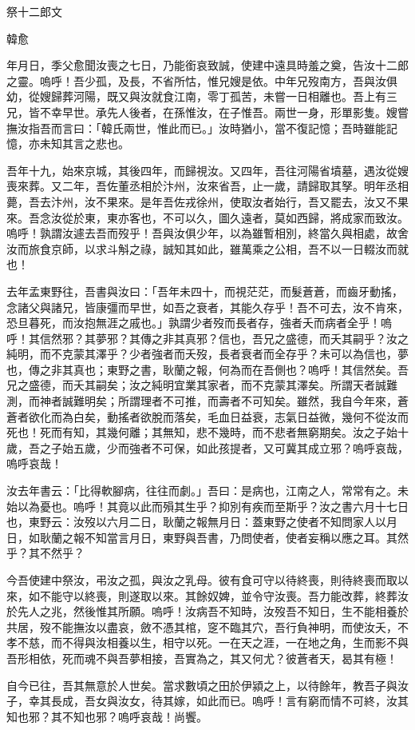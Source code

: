 祭十二郎文

韓愈

年月日，季父愈聞汝喪之七日，乃能銜哀致誠，使建中遠具時羞之奠，告汝十二郎之靈。嗚呼！吾少孤，及長，不省所怙，惟兄嫂是依。中年兄歿南方，吾與汝俱幼，從嫂歸葬河陽，既又與汝就食江南，零丁孤苦，未嘗一日相離也。吾上有三兄，皆不幸早世。承先人後者，在孫惟汝，在子惟吾。兩世一身，形單影隻。嫂嘗撫汝指吾而言曰：「韓氏兩世，惟此而已。」汝時猶小，當不復記憶；吾時雖能記憶，亦未知其言之悲也。

吾年十九，始來京城，其後四年，而歸視汝。又四年，吾往河陽省墳墓，遇汝從嫂喪來葬。又二年，吾佐董丞相於汴州，汝來省吾，止一歲，請歸取其孥。明年丞相薨，吾去汴州，汝不果來。是年吾佐戎徐州，使取汝者始行，吾又罷去，汝又不果來。吾念汝從於東，東亦客也，不可以久，圖久遠者，莫如西歸，將成家而致汝。嗚呼！孰謂汝遽去吾而歿乎！吾與汝俱少年，以為雖暫相別，終當久與相處，故舍汝而旅食京師，以求斗斛之祿，誠知其如此，雖萬乘之公相，吾不以一日輟汝而就也！

去年孟東野往，吾書與汝曰：「吾年未四十，而視茫茫，而髮蒼蒼，而齒牙動搖，念諸父與諸兄，皆康彊而早世，如吾之衰者，其能久存乎！吾不可去，汝不肯來，恐旦暮死，而汝抱無涯之戚也。」孰謂少者歿而長者存，強者夭而病者全乎！嗚呼！其信然邪？其夢邪？其傳之非其真邪？信也，吾兄之盛德，而夭其嗣乎？汝之純明，而不克蒙其澤乎？少者強者而夭歿，長者衰者而全存乎？未可以為信也，夢也，傳之非其真也；東野之書，耿蘭之報，何為而在吾側也？嗚呼！其信然矣。吾兄之盛德，而夭其嗣矣；汝之純明宜業其家者，而不克蒙其澤矣。所謂天者誠難測，而神者誠難明矣；所謂理者不可推，而壽者不可知矣。雖然，我自今年來，蒼蒼者欲化而為白矣，動搖者欲脫而落矣，毛血日益衰，志氣日益微，幾何不從汝而死也！死而有知，其幾何離；其無知，悲不幾時，而不悲者無窮期矣。汝之子始十歲，吾之子始五歲，少而強者不可保，如此孩提者，又可冀其成立邪？嗚呼哀哉，嗚呼哀哉！

汝去年書云：「比得軟腳病，往往而劇。」吾曰：是病也，江南之人，常常有之。未始以為憂也。嗚呼！其竟以此而殞其生乎？抑別有疾而至斯乎？汝之書六月十七日也，東野云：汝歿以六月二日，耿蘭之報無月日：蓋東野之使者不知問家人以月日，如耿蘭之報不知當言月日，東野與吾書，乃問使者，使者妄稱以應之耳。其然乎？其不然乎？

今吾使建中祭汝，弔汝之孤，與汝之乳母。彼有食可守以待終喪，則待終喪而取以來，如不能守以終喪，則遂取以來。其餘奴婢，並令守汝喪。吾力能改葬，終葬汝於先人之兆，然後惟其所願。嗚呼！汝病吾不知時，汝歿吾不知日，生不能相養於共居，歿不能撫汝以盡哀，斂不憑其棺，窆不臨其穴，吾行負神明，而使汝夭，不孝不慈，而不得與汝相養以生，相守以死。一在天之涯，一在地之角，生而影不與吾形相依，死而魂不與吾夢相接，吾實為之，其又何尤？彼蒼者天，曷其有極！

自今已往，吾其無意於人世矣。當求數頃之田於伊潁之上，以待餘年，教吾子與汝子，幸其長成，吾女與汝女，待其嫁，如此而已。嗚呼！言有窮而情不可終，汝其知也邪？其不知也邪？嗚呼哀哉！尚饗。